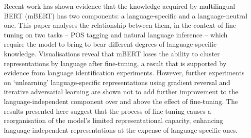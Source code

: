 Recent work has shown evidence that the knowledge acquired by multilingual BERT (mBERT) has two components: a language-specific and a language-neutral one. This paper analyses the relationship between them, in the context of fine-tuning on two tasks -- POS tagging and natural language inference -- which require the model to bring to bear different degrees of language-specific knowledge. Visualisations reveal that mBERT loses the ability to cluster representations by language after fine-tuning, a result that is supported by evidence from language identification experiments. However, further experiments on `unlearning' language-specific representations using gradient reversal and iterative adversarial learning are shown not to add further improvement to the language-independent component over and above the effect of fine-tuning. The results presented here suggest that the process of fine-tuning causes a reorganisation of the model's limited representational capacity, enhancing language-independent representations at the expense of language-specific ones.
